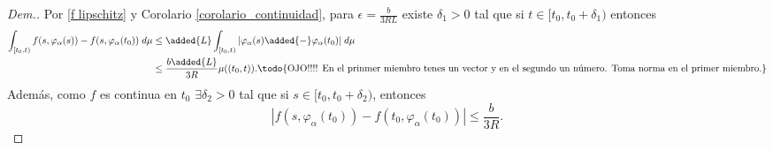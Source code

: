 \begin{proof}[Dem.]
Por \eqref{f lipschitz} y Corolario \ref{corolario_continuidad}, para $\epsilon=\frac{b}{3RL}$ existe $\delta_1>0$ tal que si $t\in[t_0,t_0+\delta_1)$ entonces
\begin{equation}
    \begin{split}
        \int_{[t_0,t)} f(s,\varphi_\alpha(s))-f(s,\varphi_\alpha(t_0))\; d\mu& \leq \added{L} \int_{[t_0,t)} |\varphi_\alpha(s)\added{-}\varphi_\alpha(t_0)|\; d\mu \\ &\leq \frac{b\added{L} }{3R}\mu((t_0,t)). \textrm{\todo{OJO!!!!  En el prinmer miembro tenes un vector y en el segundo un número. Toma norma en el primer miembro.}}
    \end{split}\label{eq:A}
\end{equation}
Además, como $f$ es continua en $t_0$ $\exists \delta_2>0 $ tal que si $s\in [t_0,t_0+\delta_2)$, entonces
\begin{equation}
    |f(s,\varphi_\alpha(t_0))-f(t_0,\varphi_\alpha(t_0))|\leq \frac{b}{3R}.\label{eq:B}
\end{equation}


\end{proof}
